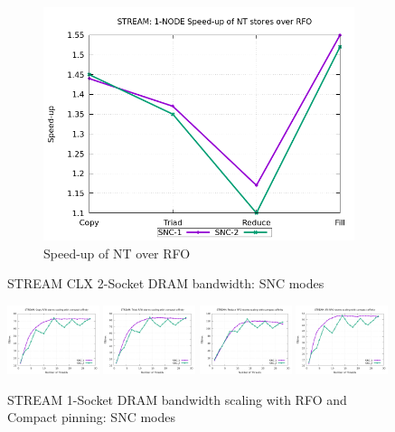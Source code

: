 \documentclass{article}
\begin{document}
\begin{figure}[!hb]
\begin{subfigure}[!hb]{0.3\textwidth}
         \centering
         \includegraphics[width=\textwidth]{../data/clx-8280l-snc/mem_bw_node/mb_node_nt_rfo}
         \caption{Speed-up of NT over RFO}
         \label{figure:mem_bw_node_nt_rfo_clx_snc}
    \end{subfigure}

    \caption{STREAM CLX 2-Socket DRAM bandwidth: SNC modes}
    \label{figure:mem_bw_node_clx_snc}
\end{figure}


\begin{figure}[!hb]
    \centering
    \includegraphics[width=0.24\textwidth]{../data/clx-8280l-snc/mem_bw_scale/mb_scale_compact_Copy_rfo}
    \includegraphics[width=0.24\textwidth]{../data/clx-8280l-snc/mem_bw_scale/mb_scale_compact_Triad_rfo}
    \includegraphics[width=0.24\textwidth]{../data/clx-8280l-snc/mem_bw_scale/mb_scale_compact_Reduce_rfo}
    \includegraphics[width=0.24\textwidth]{../data/clx-8280l-snc/mem_bw_scale/mb_scale_compact_Fill_rfo}
    \caption{STREAM 1-Socket DRAM bandwidth scaling with RFO and Compact pinning: SNC modes}
    \label{figure:mem_bw_scale_compact_rfo_clx_snc}
\end{figure}
\end{document}
